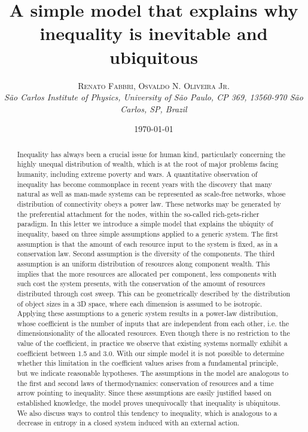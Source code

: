 \documentclass[a4paper, 11pt]{article} %
\title{\textbf{A simple model that explains why inequality is inevitable and ubiquitous}\\ %
} %
\author{\textsc{Renato Fabbri, Osvaldo N. Oliveira Jr.} %
\\{\textit{São Carlos Institute of Physics, University of São Paulo, CP 369, 13560-970 São Carlos, SP, Brazil}}} %
\date{\today} %
\makeatletter
\renewcommand{\maketitle}{ %
\begin{flushright} %
{\LARGE\@title} %

\vspace{20pt} %

{\large\@author} %
\\\@date %

\vspace{30pt} %
\end{flushright}
}
\makeatother
\begin{document}
\maketitle %



%
\begin{abstract}
	Inequality has always been a crucial issue for human kind, particularly concerning the highly unequal distribution of wealth, which is at the root of major problems facing humanity, including extreme poverty and wars.
	A quantitative observation of inequality has become commonplace in recent years with the discovery that many natural as well as man-made systems can be represented as scale-free networks, whose distribution of connectivity obeys a power law.
	These networks may be generated by the preferential attachment for the nodes, within the so-called rich-gets-richer paradigm.
	In this letter we introduce a simple model that explains the ubiquity of inequality, based on three simple assumptions applied to a generic system.
	The first assumption is that the amount of each resource input to the system is fixed, as in a conservation law. Second assumption is the diversity of the components. The third assumption is an uniform distribution of resources along component wealth.
	This implies that the more resources are allocated per component, less components with such cost the system presents, with the conservation of the amount of resources distributed through cost sweep.
	This can be geometrically described by the distribution of object sizes in a 3D space, where each dimension is assumed to be isotropic.
	Applying these assumptions to a generic system results in a power-law distribution, whose coefficient is the number of inputs that are independent from each other, i.e. the dimensionsionality of the allocated resources.
	Even though there is no restriction to the value of the coefficient, in practice we observe that existing systems normally exhibit a coefficient between 1.5 and 3.0.
	With our simple model it is not possible to determine whether this limitation in the coefficient values arises from a fundamental principle, but we indicate reasonable hypotheses.
	The assumptions in the model are analogous to the first and second laws of thermodynamics: conservation of resources and a time arrow pointing to inequality.
	Since these assumptions are easily justified based on established knowledge, the model proves unequivocally that inequality is ubiquitous.
	We also discuss ways to control this tendency to inequality, which is analogous to a decrease in entropy in a closed system induced with an external action.
\end{abstract}
\end{document}
